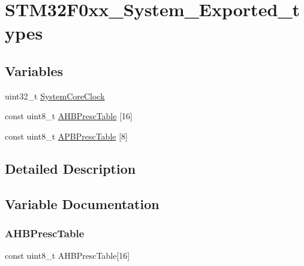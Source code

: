 \hypertarget{group___s_t_m32_f0xx___system___exported__types}{}\section{S\+T\+M32\+F0xx\+\_\+\+System\+\_\+\+Exported\+\_\+types}
\label{group___s_t_m32_f0xx___system___exported__types}
\subsection*{Variables}
\begin{DoxyCompactItemize}
\item 
uint32\+\_\+t \hyperlink{group___s_t_m32_f0xx___system___exported__types_gaa3cd3e43291e81e795d642b79b6088e6}{System\+Core\+Clock}
\item 
const uint8\+\_\+t \hyperlink{group___s_t_m32_f0xx___system___exported__types_ga6e1d9cd666f0eacbfde31e9932a93466}{A\+H\+B\+Presc\+Table} \mbox{[}16\mbox{]}
\item 
const uint8\+\_\+t \hyperlink{group___s_t_m32_f0xx___system___exported__types_ga5b4f8b768465842cf854a8f993b375e9}{A\+P\+B\+Presc\+Table} \mbox{[}8\mbox{]}
\end{DoxyCompactItemize}


\subsection{Detailed Description}


\subsection{Variable Documentation}
\mbox{\label{group___s_t_m32_f0xx___system___exported__types_ga6e1d9cd666f0eacbfde31e9932a93466}} 
\subsubsection{\texorpdfstring{A\+H\+B\+Presc\+Table}{AHBPrescTable}}
{\footnotesize\ttfamily const uint8\+\_\+t A\+H\+B\+Presc\+Table\mbox{[}16\mbox{]}}

